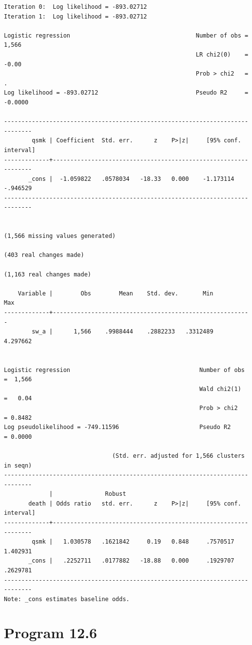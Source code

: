 \documentclass[
  10pt,
  a4paper,
]{book}
\begin{document}
\begin{verbatim}
Iteration 0:  Log likelihood = -893.02712  
Iteration 1:  Log likelihood = -893.02712  

Logistic regression                                    Number of obs =   1,566
                                                       LR chi2(0)    =   -0.00
                                                       Prob > chi2   =       .
Log likelihood = -893.02712                            Pseudo R2     = -0.0000

------------------------------------------------------------------------------
        qsmk | Coefficient  Std. err.      z    P>|z|     [95% conf. interval]
-------------+----------------------------------------------------------------
       _cons |  -1.059822   .0578034   -18.33   0.000    -1.173114    -.946529
------------------------------------------------------------------------------


(1,566 missing values generated)

(403 real changes made)

(1,163 real changes made)

    Variable |        Obs        Mean    Std. dev.       Min        Max
-------------+---------------------------------------------------------
        sw_a |      1,566    .9988444    .2882233   .3312489   4.297662


Logistic regression                                     Number of obs =  1,566
                                                        Wald chi2(1)  =   0.04
                                                        Prob > chi2   = 0.8482
Log pseudolikelihood = -749.11596                       Pseudo R2     = 0.0000

                               (Std. err. adjusted for 1,566 clusters in seqn)
------------------------------------------------------------------------------
             |               Robust
       death | Odds ratio   std. err.      z    P>|z|     [95% conf. interval]
-------------+----------------------------------------------------------------
        qsmk |   1.030578   .1621842     0.19   0.848     .7570517    1.402931
       _cons |   .2252711   .0177882   -18.88   0.000     .1929707    .2629781
------------------------------------------------------------------------------
Note: _cons estimates baseline odds.
\end{verbatim}

\section{Program 12.6}\label{program-12.6-1}
\end{document}
